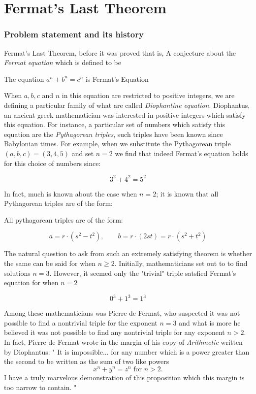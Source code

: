 \section{Fermat's Last Theorem}


\subsubsection{Problem statement and its history}
Fermat's Last Theorem, before it was proved that is, A conjecture about the \textit{Fermat equation} which is defined to be

\begin{definition}
    The equation $a^n + b^n = c^n$ is Fermat's Equation
\end{definition}

When $a, b, c$ and $n$ in this equation are restricted to positive integers, we are defining a particular family of what are called \textit{Diophantine equation}.
Diophantus, an ancient greek mathematician was interested in positive integers which satisfy this equation. For instance, a particular set of numbers which satisfy this equation 
are the \textit{Pythagorean triples}, such triples have been known since Babylonian times. For example, when we substitute the Pythagorean triple $(a,b,c) = (3,4,5)$ and set $n = 2$ we find that 
indeed Fermat's equation holds for this choice of numbers since:

\[
3^2 + 4^2 = 5^2
\]

In fact, much is known about the case when $n = 2$; it is known that all Pythagorean triples are of the form:

\begin{theorem}
    All pythagorean triples are of the form:

    \[
    a = r \cdot (s^2 - t^2), \qquad b = r \cdot (2st) = r \cdot (s^2 + t^2)
    \]
\end{theorem}

The natural question to ask from such an extremely satisfying theorem is whether the same can be said for when $n \ge 2$. Initially, mathematicians set out to
to find solutions $n = 3$. However, it seemed only the "trivial" triple satsfied Fermat's equation for when $n = 2$

\[
0^3 + 1^3 = 1^3
\]

Among these mathematicians was Pierre de Fermat, who suspected it was not possible to find a nontrivial triple for the exponent $n= 3$ and what is more he believed
it was not possible to find any nontrivial triple for any exponent $n > 2$. In fact, Pierre de Fermat wrote in the margin of his copy of \textit{Arithmetic} written by Diophantus:
"
It is impossible... for any number which is a power greater than the second to be written as the sum of two like powers 
\[ 
x^n + y^n = z^n \text{ for } n > 2.
\]
I have a truly marvelous demonstration of this proposition which this margin is too narrow to contain.
"

